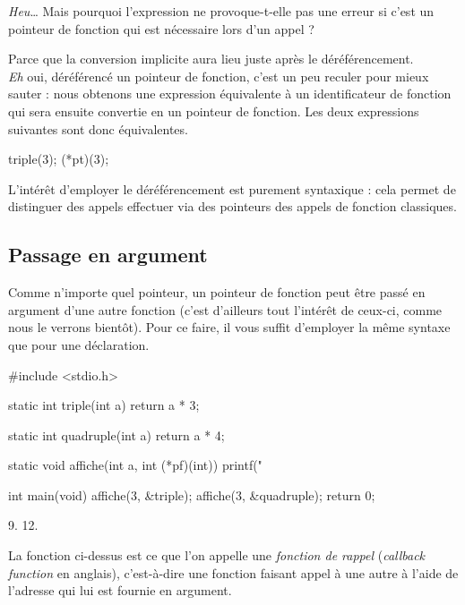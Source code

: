 \begin{questionbox}
  \emph{Heu}\ldots{} Mais pourquoi
l'expression  ne provoque-t-elle pas une erreur si
c'est un pointeur de fonction qui est nécessaire lors d'un appel ?
\end{questionbox}


Parce que la conversion implicite aura lieu juste après le
déréférencement.\\
\emph{Eh} oui, déréférencé un pointeur de fonction, c'est un peu reculer
pour mieux sauter : nous obtenons une expression équivalente à un
identificateur de fonction qui sera ensuite convertie en un pointeur de
fonction. Les deux expressions suivantes sont donc équivalentes.

\begin{C}
triple(3);
(*pt)(3);
\end{C}

L'intérêt d'employer le déréférencement est purement syntaxique : cela
permet de distinguer des appels effectuer via des pointeurs des appels
de fonction classiques.

\subsection{Passage en argument}
\label{passage-en-argument-2}

Comme n'importe quel pointeur, un pointeur de fonction peut être passé
en argument d'une autre fonction (c'est d'ailleurs tout l'intérêt de
ceux-ci, comme nous le verrons bientôt). Pour ce faire, il vous suffit
d'employer la même syntaxe que pour une déclaration.

\begin{C}
#include <stdio.h>


static int triple(int a)
{
    return a * 3;
}


static int quadruple(int a)
{
    return a * 4;
}


static void affiche(int a, int (*pf)(int))
{
    printf("%
}


int main(void)
{
    affiche(3, &triple);
    affiche(3, &quadruple);
    return 0;
}
\end{C}

\begin{C}
9.
12.
\end{C}

\begin{infobox}
  La fonction 
ci-dessus est ce que l'on appelle une \emph{fonction de rappel}
(\emph{callback function} en anglais), c'est-à-dire une fonction faisant
appel à une autre à l'aide de l'adresse qui lui est fournie en argument.
\end{infobox}


